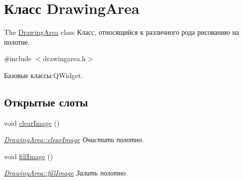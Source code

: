 \hypertarget{class_drawing_area}{\section{Класс Drawing\+Area}
\label{class_drawing_area}
}


The \hyperlink{class_drawing_area}{Drawing\+Area} class Класс, относящийся к различного рода рисованию на полотне.  




{\ttfamily \#include $<$drawingarea.\+h$>$}



Базовые классы\+:Q\+Widget.

\subsection*{Открытые слоты}
\begin{DoxyCompactItemize}
\item 
void \hyperlink{class_drawing_area_a8f00c8499212f1077d728fec8cbdfbe5}{clear\+Image} ()
\begin{DoxyCompactList}\small\item\em \hyperlink{class_drawing_area_a8f00c8499212f1077d728fec8cbdfbe5}{Drawing\+Area\+::clear\+Image} Очистить полотно. \end{DoxyCompactList}\item 
void \hyperlink{class_drawing_area_a1fec4c43bc86139083c3dc6dfa11d30c}{fill\+Image} ()
\begin{DoxyCompactList}\small\item\em \hyperlink{class_drawing_area_a1fec4c43bc86139083c3dc6dfa11d30c}{Drawing\+Area\+::fill\+Image} Залить полотно. \end{DoxyCompactList}\end{DoxyCompactItemize}
